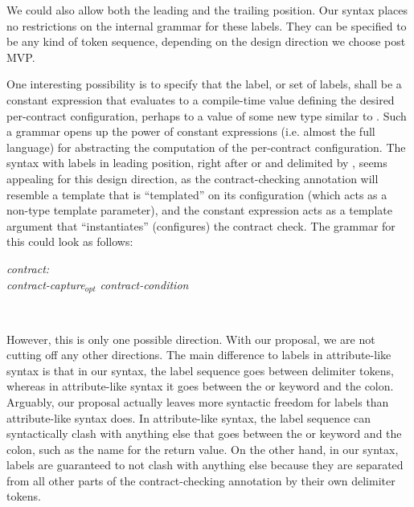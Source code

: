 We could also allow both the leading and the trailing position. Our syntax places no restrictions on the internal grammar for these labels. They can be specified to be any kind of token sequence, depending on the design direction we choose post MVP.

One interesting possibility is to specify that the label, or set of labels, shall be a constant expression that evaluates to a compile-time value defining the desired per-contract configuration, perhaps to a value of some new type  similar to . Such a grammar opens up the power of constant expressions (i.e. almost the full language) for abstracting the computation of the per-contract configuration. The syntax with labels in leading position, right after  or  and delimited by \mbox{}, seems appealing for this design direction, as the contract-checking annotation will resemble a template that is ``templated'' on its configuration (which acts as a non-type template parameter), and the constant expression acts as a template argument that ``instantiates'' (configures) the contract check. The grammar for this could look as follows:

\begin{adjustwidth}{0.5cm}{0.5cm}

\emph{contract:} \\
\phantom{~~~} \emph{contract-capture}$_{opt}$ \emph{contract-condition}

 \\
\phantom{~~~}

\end{adjustwidth}

However, this is only one possible direction. With our proposal, we are not cutting off any other directions. The main difference to labels in attribute-like syntax is that in our syntax, the label sequence goes between delimiter tokens, whereas in attribute-like syntax it goes between the  or  keyword and the colon. Arguably, our proposal actually leaves more syntactic freedom for labels than attribute-like syntax does. In attribute-like syntax, the label sequence can syntactically clash with anything else that goes between the  or  keyword and the colon, such as the name for the return value. On the other hand, in our syntax, labels are guaranteed to not clash with anything else because they are separated from all other parts of the contract-checking annotation by their own delimiter tokens.

